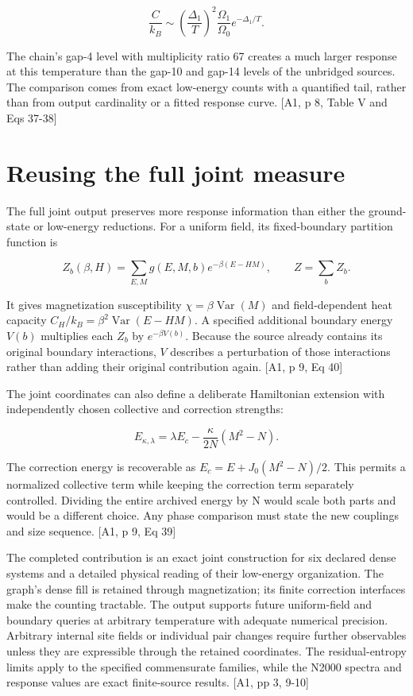\[\frac{C}{k_B}\sim\left(\frac{\Delta_1}{T}\right)^2\frac{\Omega_1}{\Omega_0}e^{-\Delta_1/T}.\]

The chain's gap-4 level with multiplicity ratio 67 creates a much larger response at this temperature than the gap-10 and gap-14 levels of the unbridged sources. The comparison comes from exact low-energy counts with a quantified tail, rather than from output cardinality or a fitted response curve. {[}A1, p 8, Table V and Eqs 37-38{]}

\section{Reusing the full joint measure}\label{reusing-the-full-joint-measure}

The full joint output preserves more response information than either the ground-state or low-energy reductions. For a uniform field, its fixed-boundary partition function is

\[Z_b(\beta,H)=\sum_{E,M}g(E,M,b)e^{-\beta(E-HM)},\qquad Z=\sum_bZ_b.\]

It gives magnetization susceptibility \(\chi=\beta\operatorname{Var}(M)\) and field-dependent heat capacity \(C_H/k_B=\beta^2\operatorname{Var}(E-HM)\). A specified additional boundary energy \(V(b)\) multiplies each \(Z_b\) by \(e^{-\beta V(b)}\). Because the source already contains its original boundary interactions, \(V\) describes a perturbation of those interactions rather than adding their original contribution again. {[}A1, p 9, Eq 40{]}

The joint coordinates can also define a deliberate Hamiltonian extension with independently chosen collective and correction strengths:

\[E_{\kappa,\lambda}=\lambda E_c-\frac{\kappa}{2N}(M^2-N).\]

The correction energy is recoverable as \(E_c=E+J_0(M^2-N)/2\). This permits a normalized collective term while keeping the correction term separately controlled. Dividing the entire archived energy by N would scale both parts and would be a different choice. Any phase comparison must state the new couplings and size sequence. {[}A1, p 9, Eq 39{]}

The completed contribution is an exact joint construction for six declared dense systems and a detailed physical reading of their low-energy organization. The graph's dense fill is retained through magnetization; its finite correction interfaces make the counting tractable. The output supports future uniform-field and boundary queries at arbitrary temperature with adequate numerical precision. Arbitrary internal site fields or individual pair changes require further observables unless they are expressible through the retained coordinates. The residual-entropy limits apply to the specified commensurate families, while the N2000 spectra and response values are exact finite-source results. {[}A1, pp 3, 9-10{]}
